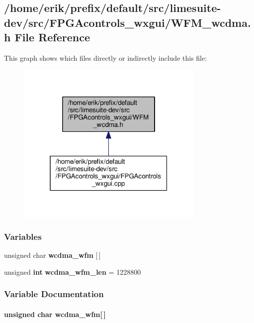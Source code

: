 \subsection{/home/erik/prefix/default/src/limesuite-\/dev/src/\+F\+P\+G\+Acontrols\+\_\+wxgui/\+W\+F\+M\+\_\+wcdma.h File Reference}
\label{WFM__wcdma_8h}
This graph shows which files directly or indirectly include this file\+:
\nopagebreak
\begin{figure}[H]
\begin{center}
\leavevmode
\includegraphics[width=256pt]{d4/dc1/WFM__wcdma_8h__dep__incl}
\end{center}
\end{figure}
\subsubsection*{Variables}
\begin{DoxyCompactItemize}
\item 
unsigned char {\bf wcdma\+\_\+wfm} [$\,$]
\item 
unsigned {\bf int} {\bf wcdma\+\_\+wfm\+\_\+len} = 1228800
\end{DoxyCompactItemize}


\subsubsection{Variable Documentation}
\paragraph[{wcdma\+\_\+wfm}]{\setlength{\rightskip}{0pt plus 5cm}unsigned char wcdma\+\_\+wfm[$\,$]}\label{WFM__wcdma_8h_aba086c38a92d6ccc36e23c65c44a6c90}


